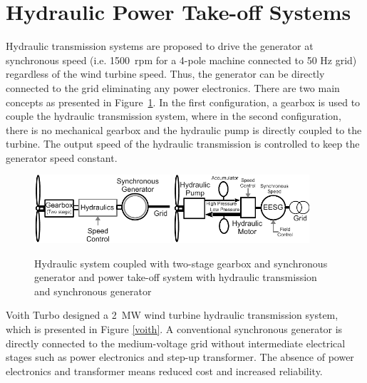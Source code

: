 \documentclass[a4paper, 11pt]{article} %
\begin{document}
\section{Hydraulic Power Take-off Systems}

Hydraulic transmission systems are proposed to drive the generator at synchronous speed (i.e. 1500~rpm for a 4-pole machine connected to 50 Hz grid) regardless of the wind turbine speed. Thus, the generator can be directly connected to the grid eliminating any power electronics. There are two main concepts as presented in Figure~\ref{hydraulics}. In the first configuration, a gearbox is used to couple the hydraulic transmission system, where in the second configuration, there is no mechanical gearbox and the hydraulic pump is directly coupled to the turbine. The output speed of the hydraulic transmission is controlled to keep the generator speed constant.

  \begin{figure}
    \centering
    \includegraphics[width=0.45\textwidth]{hydraulics}
    \hfill
    \includegraphics[width=0.45\textwidth]{EESG_hydraulics}
    \caption{Hydraulic system coupled with two-stage gearbox and synchronous generator and power take-off system with hydraulic transmission and synchronous generator } 
    \label{hydraulics}
  \end{figure}

Voith Turbo designed a 2~MW wind turbine hydraulic transmission system, which is presented in Figure \ref{voith}. A conventional synchronous generator is directly connected to the medium-voltage grid without intermediate electrical stages such as power electronics and step-up transformer. The absence of power electronics and transformer means reduced cost and increased reliability.
\end{document}
